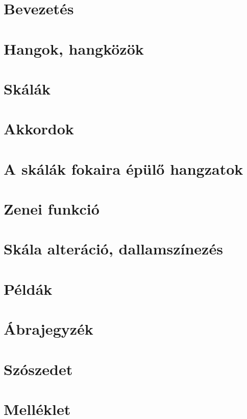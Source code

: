 
 
 





\tableofcontents
\clearpage

\section*{Bevezetés}
\label{sec:bevezetes}


\section{Hangok, hangközök}
\label{sec:hangokhangkozok}


\section{Skálák}
\label{sec:skalak}


\section{Akkordok}
\label{sec:akkordok}


\section{A skálák fokaira épülő hangzatok}
\label{sec:skalahangzat}


\section{Zenei funkció}
\label{sec:funkcio}


\section{Skála alteráció, dallamszínezés}
\label{sec:alteracio}


\section{Példák}
\label{sec:peldak}


\section{Ábrajegyzék}
\label{app:abrajegyzek}
\listoffigures

\section{Szószedet}
\label{app:szoszedet}

\printglossaries

\section{Melléklet}
\label{sec:melleklet}

%


